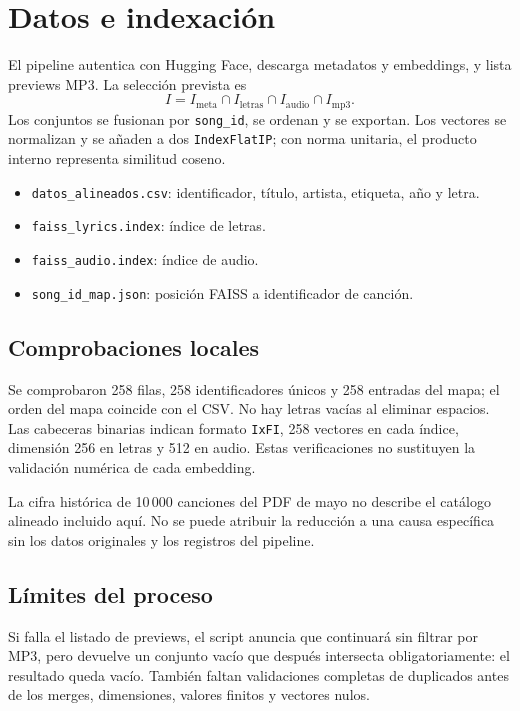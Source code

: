 \documentclass[11pt,a4paper]{article}
\newcommand{\code}[1]{\nolinkurl{#1}}
\begin{document}
\section{Datos e indexación}
El pipeline autentica con Hugging Face, descarga metadatos y embeddings, y lista previews MP3. La selección prevista es
\[
I=I_{\mathrm{meta}}\cap I_{\mathrm{letras}}\cap I_{\mathrm{audio}}\cap I_{\mathrm{mp3}}.
\]
Los conjuntos se fusionan por \code{song_id}, se ordenan y se exportan. Los vectores se normalizan y se añaden a dos \code{IndexFlatIP}; con norma unitaria, el producto interno representa similitud coseno.

\begin{itemize}
\item \code{datos_alineados.csv}: identificador, título, artista, etiqueta, año y letra.
\item \code{faiss_lyrics.index}: índice de letras.
\item \code{faiss_audio.index}: índice de audio.
\item \code{song_id_map.json}: posición FAISS a identificador de canción.
\end{itemize}

\subsection{Comprobaciones locales}
Se comprobaron 258 filas, 258 identificadores únicos y 258 entradas del mapa; el orden del mapa coincide con el CSV. No hay letras vacías al eliminar espacios. Las cabeceras binarias indican formato \code{IxFI}, 258 vectores en cada índice, dimensión 256 en letras y 512 en audio. Estas verificaciones no sustituyen la validación numérica de cada embedding.

La cifra histórica de 10\,000 canciones del PDF de mayo no describe el catálogo alineado incluido aquí. No se puede atribuir la reducción a una causa específica sin los datos originales y los registros del pipeline.

\subsection{Límites del proceso}
Si falla el listado de previews, el script anuncia que continuará sin filtrar por MP3, pero devuelve un conjunto vacío que después intersecta obligatoriamente: el resultado queda vacío. También faltan validaciones completas de duplicados antes de los merges, dimensiones, valores finitos y vectores nulos.
\end{document}
